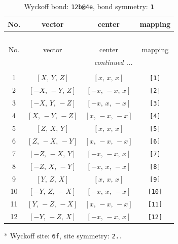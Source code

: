 \documentclass[fleqn,8pt]{jsarticle}
\begin{document}
\begin{longtable}{cccc}
\caption{Wyckoff bond: {\tt 12b@4e}, bond symmetry: {\tt 1}}
 \\
 \hline \hline
No. & vector & center & mapping \\ \hline \endfirsthead

\multicolumn{3}{l}{\tablename\ \thetable{}} \\
 \hline \hline
No. & vector & center & mapping \\ \hline \endhead

 \hline \hline
\multicolumn{3}{r}{\footnotesize\it continued ...} \\ \endfoot

 \hline \hline
\multicolumn{3}{r}{} \\ \endlastfoot

1 & $\left[ X,\, Y,\, Z \right]$ & $\left[ x,\, x,\, x \right]$ & {\tt [1]} \\ \hline
2 & $\left[ - X,\, - Y,\, Z \right]$ & $\left[ - x,\, - x,\, x \right]$ & {\tt [2]} \\ \hline
3 & $\left[ - X,\, Y,\, - Z \right]$ & $\left[ - x,\, x,\, - x \right]$ & {\tt [3]} \\ \hline
4 & $\left[ X,\, - Y,\, - Z \right]$ & $\left[ x,\, - x,\, - x \right]$ & {\tt [4]} \\ \hline
5 & $\left[ Z,\, X,\, Y \right]$ & $\left[ x,\, x,\, x \right]$ & {\tt [5]} \\ \hline
6 & $\left[ Z,\, - X,\, - Y \right]$ & $\left[ x,\, - x,\, - x \right]$ & {\tt [6]} \\ \hline
7 & $\left[ - Z,\, - X,\, Y \right]$ & $\left[ - x,\, - x,\, x \right]$ & {\tt [7]} \\ \hline
8 & $\left[ - Z,\, X,\, - Y \right]$ & $\left[ - x,\, x,\, - x \right]$ & {\tt [8]} \\ \hline
9 & $\left[ Y,\, Z,\, X \right]$ & $\left[ x,\, x,\, x \right]$ & {\tt [9]} \\ \hline
10 & $\left[ - Y,\, Z,\, - X \right]$ & $\left[ - x,\, x,\, - x \right]$ & {\tt [10]} \\ \hline
11 & $\left[ Y,\, - Z,\, - X \right]$ & $\left[ x,\, - x,\, - x \right]$ & {\tt [11]} \\ \hline
12 & $\left[ - Y,\, - Z,\, X \right]$ & $\left[ - x,\, - x,\, x \right]$ & {\tt [12]} \\
\end{longtable}
* Wyckoff site: {\tt 6f}, site symmetry: {\tt 2..}
\renewcommand{\arraystretch}{1.2}
\end{document}
